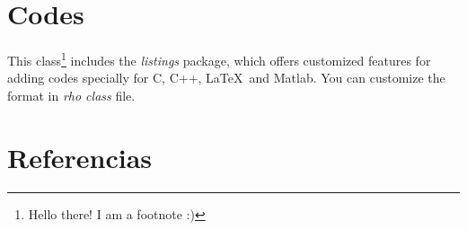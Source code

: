 \documentclass[9pt,letterpaper,onecolumn]{rho-class/rho}
\begin{document}
\section{Codes}

    This class\footnote{Hello there! I am a footnote :)} includes the \textit{listings} package, which offers customized features for adding codes specially for C, C++, \LaTeX\ and Matlab. You can customize the format in \textit{rho class} file.

    

    
        

\newpage
\section{Referencias}


\end{document}
